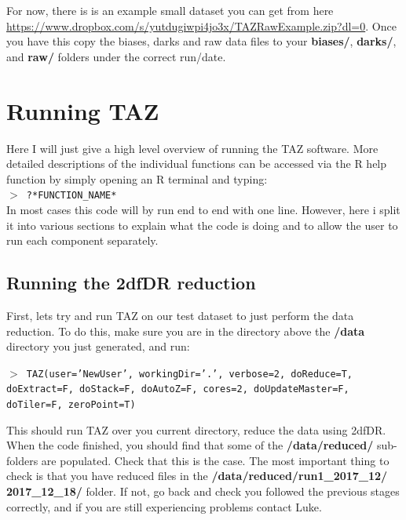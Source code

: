 \documentclass[12pt]{article}
\begin{document}
For now, there is is an example small dataset you can get from here \url{https://www.dropbox.com/s/yutdugiwpi4jo3x/TAZRawExample.zip?dl=0}. Once you have this copy the biases, darks and raw data files to your \textbf{biases/}, \textbf{darks/}, and \textbf{raw/} folders under the correct run/date.  

\section{Running TAZ}

Here I will just give a high level overview of running the TAZ software. More detailed descriptions of the individual functions can be accessed via the R help function by simply opening an R terminal and typing: \\

\hspace{10mm}  \texttt{$>$ ?*FUNCTION\_NAME*}\\

In most cases this code will by run end to end with one line. However, here i split it into various sections to explain what the code is doing and to allow the user to run each component separately. 

\subsection{Running the 2dfDR reduction}

First, lets try and run TAZ on our test dataset to just perform the data reduction. To do this, make sure you are in the directory above the \textbf{/data} directory you just generated, and run:

\hspace{10mm} \texttt{$>$ TAZ(user='NewUser', workingDir='.', verbose=2, doReduce=T, doExtract=F, doStack=F, doAutoZ=F, cores=2, doUpdateMaster=F, doTiler=F, zeroPoint=T)}

This should run TAZ over you current directory, reduce the data using 2dfDR. When the code finished, you should find that some of the \textbf{/data/reduced/} sub-folders are populated. Check that this is the case. The most important thing to check is that you have reduced files in the \textbf{/data/reduced/run1\_2017\_12/ \\ 2017\_12\_18/} folder.  If not, go back and check you followed the previous stages correctly, and if you are still experiencing problems contact Luke.  
\end{document}
